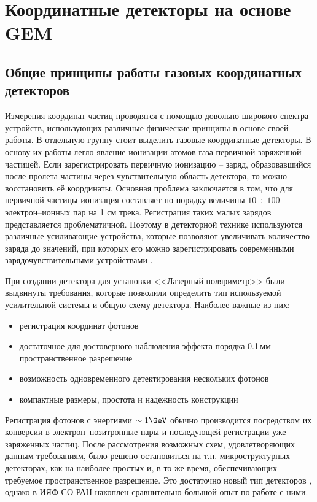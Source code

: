 \vspace{24pt}
\chapter{Координатные детекторы на основе GEM}
\label{sec:coor_GEM}
\section{Общие принципы работы газовых координатных детекторов}
Измерения координат частиц проводятся с помощью довольно широкого спектра устройств, использующих различные физические принципы в основе своей работы. В отдельную группу стоит выделить газовые координатные детекторы. В основу их работы легло явление ионизации атомов газа первичной заряженной частицей. Если зарегистрировать первичную ионизацию -- заряд, образовавшийся после пролета частицы через чувствительную область детектора, то можно восстановить её координаты. Основная проблема заключается в том, что для первичной частицы ионизация составляет по порядку величины $10 \div 100$ электрон--ионных пар на 1 см трека. Регистрация таких малых зарядов представляется проблематичной. Поэтому в детекторной технике используются различные усиливающие устройства, которые позволяют увеличивать количество заряда до значений, при которых его можно зарегистрировать современными зарядочувствительными устройствами \cite{grupen}.
\par При создании детектора для установки <<Лазерный поляриметр>> были выдвинуты требования, которые позволили определить тип используемой усилительной системы и общую схему детектора. Наиболее важные из них: 
\begin{itemize}
	\item регистрация координат фотонов
	\item достаточное для достоверного наблюдения эффекта порядка 0.1\,мм пространственное разрешение 
	\item возможность одновременного детектирования нескольких фотонов
	\item компактные размеры, простота и надежность конструкции
\end{itemize}
Регистрация фотонов с энергиями $\sim1\GeV$ обычно производится посредством их конверсии в электрон--позитронные пары и последующей регистрации уже заряженных частиц. После рассмотрения возможных схем, удовлетворяющих данным требованиям, было решено остановиться на т.н. микроструктурных детекторах, как на наиболее простых и, в то же время, обеспечивающих требуемое пространственное разрешение. Это достаточно новый тип детекторов \cite{sauli}, однако в ИЯФ СО РАН накоплен сравнительно большой опыт по работе с ними.
